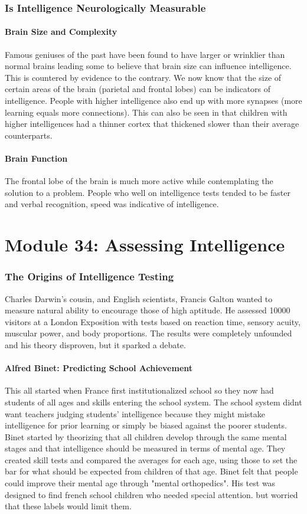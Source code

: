 \documentclass[12pt]{article}
\begin{document}
\section*{Is Intelligence Neurologically Measurable}
\subsection*{Brain Size and Complexity}
Famous geniuses of the past have been found to have larger or wrinklier than normal brains leading some to believe that brain size can influence intelligence. This is countered by evidence to the contrary. We now know that the size of certain areas of the brain (parietal and frontal lobes) can be indicators of intelligence. People with higher intelligence also end up with more synapses (more learning equals more connections). This can also be seen in that children with higher intelligences had a thinner cortex that thickened slower than their average counterparts. 
\subsection*{Brain Function} 
The frontal lobe of the brain is much more active while contemplating the solution to a problem. People who well on intelligence tests tended to be faster and verbal recognition, speed was indicative of intelligence. 

\part*{Module 34: Assessing Intelligence}
\section*{The Origins of Intelligence Testing}
Charles Darwin's cousin, and English scientists, Francis Galton wanted to measure natural ability to encourage those of high aptitude. He assessed 10000 visitors at a London Exposition with tests based on reaction time, sensory acuity, muscular power, and body proportions. The results were completely unfounded and his theory disproven, but it sparked a debate.
\subsection*{Alfred Binet: Predicting School Achievement}
This all started when France first institutionalized school so they now had students of all ages and skills entering the school system. The school system didnt want teachers judging students' intelligence because they might mistake intelligence for prior learning or simply be biased against the poorer students. Binet started by theorizing that all children develop through the same mental stages and that intelligence should be measured in terms of mental age. They created skill tests and compared the averages for each age, using those to set the bar for what should be expected from children of that age. Binet felt that people could improve their mental age through "mental orthopedics". His test was designed to find french school children who needed special attention. but worried that these labels would limit them.
\end{document}
